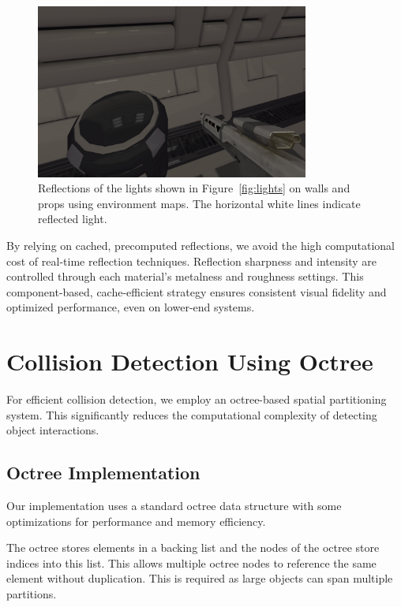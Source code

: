 \documentclass{article}
\begin{document}
\begin{figure}[h]
\centering
\includegraphics[width=0.8\textwidth]{diagrams/reflection.png}
\caption{Reflections of the lights shown in Figure~\ref{fig:lights} on walls and props using environment maps. The horizontal white lines indicate reflected light.}
\label{fig:reflections}
\end{figure}

By relying on cached, precomputed reflections, we avoid the high computational cost of real-time reflection techniques. Reflection sharpness and intensity are controlled through each material’s metalness and roughness settings. This component-based, cache-efficient strategy ensures consistent visual fidelity and optimized performance, even on lower-end systems.

\section{Collision Detection Using Octree}

For efficient collision detection, we employ an octree-based spatial
partitioning system. This significantly reduces the computational complexity of
detecting object interactions.

\subsection{Octree Implementation}

Our implementation uses a standard octree data structure with some
optimizations for performance and memory efficiency.

The octree stores elements in a backing list and the nodes of the octree store
indices into this list. This allows multiple octree nodes to reference the same
element without duplication. This is required as large objects can span
multiple partitions.
\end{document}
